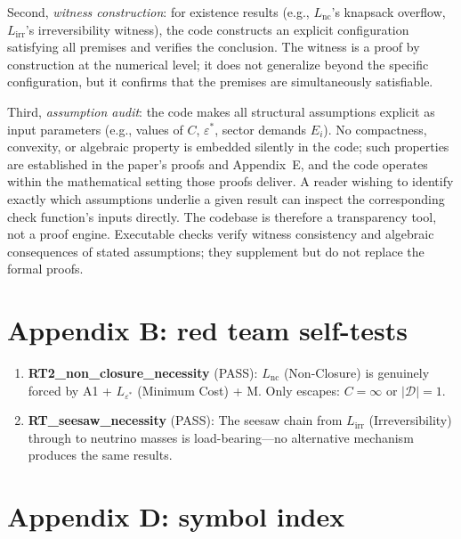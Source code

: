 \documentclass[11pt]{article}
\theoremstyle{remark}
\begin{document}
Second, \emph{witness construction}: for existence results (e.g., $L_{\mathrm{nc}}$'s knapsack overflow, $L_{\mathrm{irr}}$'s irreversibility witness), the code constructs an explicit configuration satisfying all premises and verifies the conclusion.  The witness is a proof by construction at the numerical level; it does not generalize beyond the specific configuration, but it confirms that the premises are simultaneously satisfiable.

Third, \emph{assumption audit}: the code makes all structural assumptions explicit as input parameters (e.g., values of $C$, $\varepsilon^*$, sector demands $E_i$).  No compactness, convexity, or algebraic property is embedded silently in the code; such properties are established in the paper's proofs and Appendix~E, and the code operates within the mathematical setting those proofs deliver.  A reader wishing to identify exactly which assumptions underlie a given result can inspect the corresponding check function's inputs directly.  The codebase is therefore a transparency tool, not a proof engine.  Executable checks verify witness consistency and algebraic consequences of stated assumptions; they supplement but do not replace the formal proofs.


\section{Appendix B: red team self-tests}

\begin{enumerate}
  \item \textbf{RT2\_non\_closure\_necessity} (PASS):  $L_{\mathrm{nc}}$ (Non-Closure) is genuinely forced by A1 + $L_{\varepsilon^*}$ (Minimum Cost) + M.  Only escapes: $C = \infty$ or $|\mathcal{D}| = 1$.

  \item \textbf{RT\_seesaw\_necessity} (PASS):  The seesaw chain from $L_{\mathrm{irr}}$ (Irreversibility) through to neutrino masses is load-bearing---no alternative mechanism produces the same results.
\end{enumerate}


\section{Appendix D: symbol index}
\end{document}

